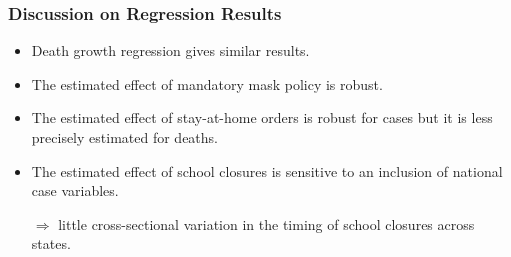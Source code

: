 \documentclass{beamer}
\begin{document}

\begin{frame}
  \frametitle{Discussion on Regression Results}
  
  
  \begin{itemize}
  
   \item Death growth regression gives similar results. \smallskip
  
  \item The estimated effect of mandatory mask policy is robust.\smallskip
  
  \item The estimated effect of stay-at-home orders is robust for cases but it is less precisely estimated for deaths.\smallskip
  
  \item The estimated effect of school closures is sensitive to an inclusion of national case variables. \medskip
  
  $\Rightarrow$ little cross-sectional variation in the timing of school closures across states.
  
  \end{itemize}
  
  
  
  
  
\end{frame}





\end{document}
